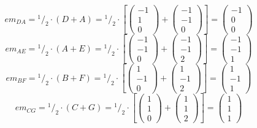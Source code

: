 \documentclass{article}
\newcommand*\rfrac[2]{{}^{#1}\!/_{#2}}%
\begin{document}
\[em_{DA}=\rfrac{1}{2}\cdot(D+A)=\rfrac{1}{2}\cdot\left[
\left({\begin{array}{c} -1 \\  1 \\ 0 \end{array}}\right)+
\left({\begin{array}{c} -1 \\  -1 \\ 0 \end{array}}\right)\right]=
\left({\begin{array}{c}  -1 \\ 0 \\ 0 \end{array}}\right)
\]
\[em_{AE}=\rfrac{1}{2}\cdot(A+E)=\rfrac{1}{2}\cdot\left[
\left({\begin{array}{c} -1 \\  -1 \\ 0 \end{array}}\right)+
\left({\begin{array}{c} -1 \\  -1 \\ 2 \end{array}}\right)\right]=
\left({\begin{array}{c} -1 \\ -1 \\ 1 \end{array}}\right)
\]
\[em_{BF}=\rfrac{1}{2}\cdot(B+F)=\rfrac{1}{2}\cdot\left[
\left({\begin{array}{c} 1 \\  -1 \\ 0 \end{array}}\right)+
\left({\begin{array}{c} 1 \\  -1 \\ 2 \end{array}}\right)\right]=
\left({\begin{array}{c} 1 \\ -1 \\ 1 \end{array}}\right)
\]
\[em_{CG}=\rfrac{1}{2}\cdot(C+G)=\rfrac{1}{2}\cdot\left[
\left({\begin{array}{c} 1 \\  1 \\ 0 \end{array}}\right)+
\left({\begin{array}{c} 1 \\  1 \\ 2 \end{array}}\right)\right]=
\left({\begin{array}{c} 1 \\ 1 \\ 1 \end{array}}\right)
\]
\end{document}
